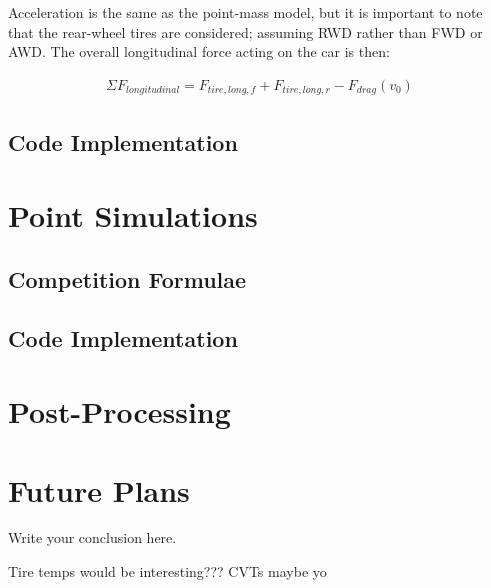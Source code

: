 \documentclass{article}
\begin{document}
Acceleration is the same as the point-mass model, but it is important to note that the rear-wheel tires are considered; assuming RWD rather than FWD or AWD. The overall longitudinal force acting on the car is then:

\begin{align}
	\Sigma F_{longitudinal} = F_{tire,long,f} + F_{tire,long,r} - F_{drag}(v_0)
\end{align}

\subsection{Code Implementation}

\section{Point Simulations}

\subsection{Competition Formulae}

\subsection{Code Implementation}

\section{Post-Processing}

\section{Future Plans}
Write your conclusion here.

Tire temps would be interesting???
CVTs maybe yo
\end{document}
